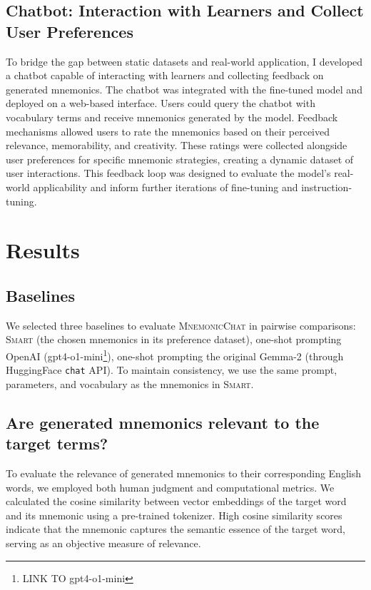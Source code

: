 \documentclass[11pt, onecolumn]{article}
\newcounter{para}
\begin{document}
\subsection{Chatbot: Interaction with Learners and Collect User Preferences} \label{sec:met-chatbot}

To bridge the gap between static datasets and real-world application, I developed a chatbot capable of interacting with learners and collecting feedback on generated mnemonics. The chatbot was integrated with the fine-tuned model and deployed on a web-based interface. Users could query the chatbot with vocabulary terms and receive mnemonics generated by the model. Feedback mechanisms allowed users to rate the mnemonics based on their perceived relevance, memorability, and creativity. These ratings were collected alongside user preferences for specific mnemonic strategies, creating a dynamic dataset of user interactions. This feedback loop was designed to evaluate the model’s real-world applicability and inform further iterations of fine-tuning and instruction-tuning.

\section{Results} \label{sec:results}
\subsection{Baselines} \label{sec:baselines}
We selected three baselines to evaluate \textsc{MnemonicChat} in pairwise comparisons: \textsc{Smart} (the chosen mnemonics in its preference dataset), one-shot prompting OpenAI (gpt4-o1-mini\footnote{LINK TO gpt4-o1-mini}), one-shot prompting the original Gemma-2 (through HuggingFace \verb|chat| API). To maintain consistency, we use the same prompt, parameters, and vocabulary as the mnemonics in \textsc{Smart}.

\subsection{Are generated mnemonics relevant to the target terms?} \label{sec:relevant}


To evaluate the relevance of generated mnemonics to their corresponding English words, we employed both human judgment and computational metrics. We calculated the cosine similarity between vector embeddings of the target word and its mnemonic using a pre-trained tokenizer. High cosine similarity scores indicate that the mnemonic captures the semantic essence of the target word, serving as an objective measure of relevance.
\end{document}

